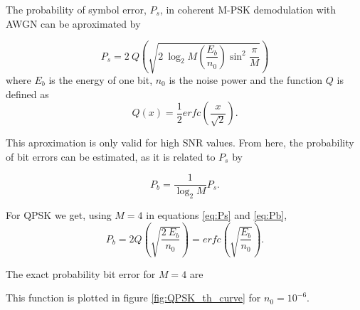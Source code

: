 The probability of symbol error, $P_s$, in coherent M-PSK demodulation with AWGN can be aproximated by

\begin{equation}
	P_s=2~Q\left(\sqrt{2~\log_2 M \left(\frac{E_b}{n_0}\right)\sin^2\frac{\pi}{M}}\right)
\end{equation}
where $E_b$ is the energy of one bit, $n_0$ is the noise power and the function $Q$ is defined as
\begin{equation}
	Q(x)=\frac{1}{2} erfc\left(\frac{x}{\sqrt{2}}\right).
	\label{eq:Ps}
\end{equation}

This aproximation is only valid for high SNR values. From here, the probability of bit errors can be estimated, as it is related to $P_s$ by

\begin{equation}
	P_b=\frac{1}{\log_2 M}P_s.
	\label{eq:Pb}
\end{equation}

For QPSK we get, using $M=4$ in equations \ref{eq:Ps} and \ref{eq:Pb},
\begin{equation}
	P_b= 2 Q\left(\sqrt{\frac{2~E_b}{n_0}}\right) = erfc\left(\sqrt{\frac{E_b}{n_0}}\right).
\end{equation}

The exact probability bit error for $M=4$ are

This function is plotted in figure \ref{fig:QPSK_th_curve} for $n_0=10^{-6}$.

